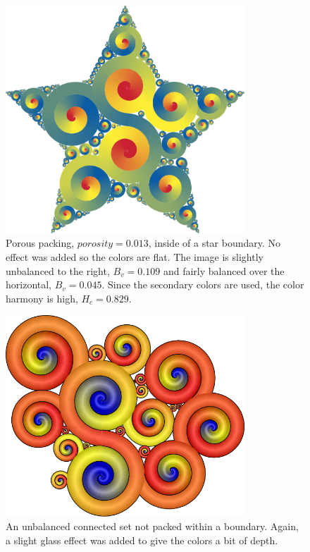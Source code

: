 \documentclass[11pt]{IEEEtran}
\begin{document}
\begin{figure}[H]
\centering \includegraphics[width=0.8\textwidth]{star2}
\caption{Porous packing, $porosity = 0.013$, inside of a star boundary. No effect was added so the colors are flat. The image is slightly unbalanced to the right, $B_{v} = 0.109$ and fairly balanced over the horizontal, $B_{v} = 0.045$. Since the secondary colors are used, the color harmony is high, $H_{c} = 0.829$. }
\end{figure}

\begin{figure}[h]
\centering \includegraphics[width=0.8\textwidth]{noboundary}
\caption{An unbalanced connected set not packed within a boundary. Again, a slight glass effect was added to give the colors a bit of depth.}
\end{figure}
\end{document}
